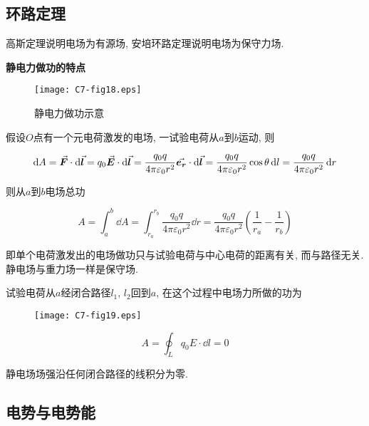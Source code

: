 \subsection{环路定理}

高斯定理说明电场为有源场, 安培环路定理说明电场为保守力场. 

\textbf{静电力做功的特点}

\begin{figure}[H]
	\centering
	\texttt{[image: C7-fig18.eps]}
	\caption{静电力做功示意}
\end{figure}

假设$O$点有一个元电荷激发的电场, 一试验电荷从$a$到$b$运动, 则

\begin{equation}
	\dd{A} = \va*{F} \cdot \dd{\va*{l}} = q_0 \va*{E} \cdot \dd{\va*{l}} =  \dfrac{q_0 q}{4 \pi \varepsilon_0 r^2}\va*{e_r} \cdot \dd{\va*{l}} = \dfrac{q_0 q}{4 \pi \varepsilon_0 r^2} \cos \theta \dd{l} = \dfrac{q_0 q}{4 \pi \varepsilon_0 r^2} \dd{r} \label{C7-eq8}
\end{equation}

则从$a$到$b$电场总功

\begin{equation}
	A = \int_{a}^{b} \dd{A} = \int_{r_a}^{r_b} {\dfrac{q_0 q}{4 \pi \varepsilon_0 r^2} \dd{r}} = \dfrac{q_0 q}{4 \pi \varepsilon_0 r^2}(\dfrac{1}{r_a} - \dfrac{1}{r_b}) \label{C7-eq9}
\end{equation}

即单个电荷激发出的电场做功只与试验电荷与中心电荷的距离有关, 而与路径无关. 静电场与重力场一样是保守场. 

\begin{theorem}[静电场的环路定理]
	试验电荷从$a$经闭合路径$l_1$, $l_2$回到$a$, 在这个过程中电场力所做的功为
	
	\begin{figure}[H]
		\centering
		\texttt{[image: C7-fig19.eps]}
	\end{figure}
	
	\begin{equation}
		A = \oint_{L}{q_0 E \cdot \dd{l}} = 0 \label{C7-eq10}
	\end{equation}
	
	静电场场强沿任何闭合路径的线积分为零. 
\end{theorem}

\subsection{电势与电势能}

